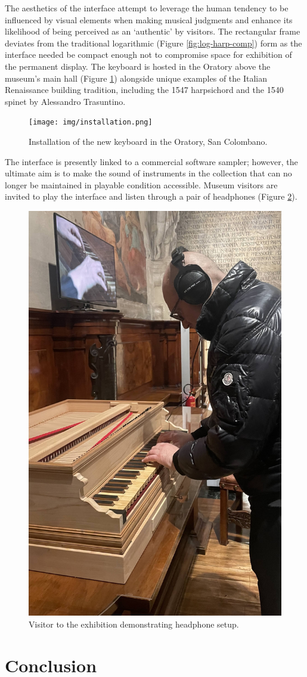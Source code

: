 The aesthetics of the interface attempt to leverage the human tendency to be influenced by visual elements when making musical judgments \cite{tsay_sight_2013, fritz_player_2012,fritz_soloist_2014,fritz_listener_2017} and enhance its likelihood of being perceived as an `authentic' by visitors. The rectangular frame deviates from the traditional logarithmic (Figure \ref{fig:log-harp-comp}) form as the interface needed be compact enough not to compromise space for exhibition of the permanent display. The keyboard is hosted in the Oratory above the museum's main hall (Figure \ref{fig:installed}) alongside unique examples of the Italian Renaissance building tradition, including the 1547 harpsichord and the 1540 spinet by Alessandro Trasuntino.

\begin{figure}
    \centering
    \texttt{[image: img/installation.png]}
    \caption{Installation of the new keyboard in the Oratory, San Colombano.}
    \label{fig:installed}
\end{figure}

The interface is presently linked to a commercial software sampler; however, the ultimate aim is to make the sound of instruments in the collection that can no longer be maintained in playable condition accessible. Museum visitors are invited to play the interface and listen through a pair of headphones (Figure \ref{fig:user}).

\begin{figure}
    \centering
    \includegraphics[width=0.33\linewidth]{img/exhibition-user-1.jpeg}
    \caption{Visitor to the exhibition demonstrating headphone setup.}
    \label{fig:user}
\end{figure}

\section{Conclusion}

